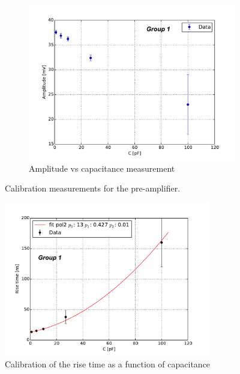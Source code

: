 \documentclass[12pt]{article}
\begin{document}
\begin{figure}[h]
\begin{subfigure}[h]{0.45\textwidth}
  \centering
  \includegraphics[width=1.2\textwidth]{./graphics/amplitude_vs_capacitance}
  \caption{Amplitude vs capacitance measurement}
  \label{fig:Amplitude_vs_Capacitance}
\end{subfigure}
\caption{Calibration measurements for the pre-amplifier.}
\label{fig:calib_others}
\end{figure}

\begin{figure}[htb]
  \centering
  \includegraphics[width=0.8\textwidth]{./graphics/calibration_diode}
  \caption{Calibration of the rise time as a function of capacitance} %
  \label{fig:RiseTime_vs_Capacitance}
\end{figure}
\end{document}
